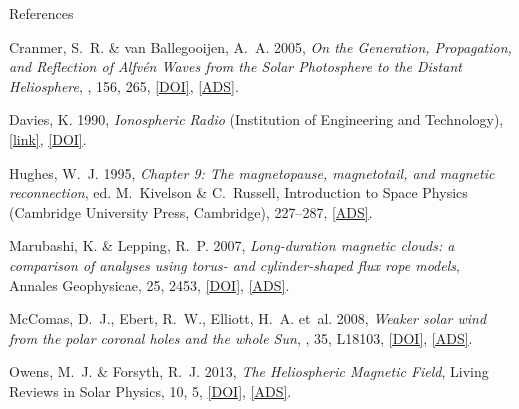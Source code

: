\documentclass[11pt,aspectratio=1610]{beamer}	%
\begin{document}
\begin{frame}[allowframebreaks]{References}
	\scriptsize
	\begin{thebibliography}{10}
	
		\beamertemplatebookbibitems
		
		\beamertemplatearticlebibitems
		
			{Cranmer}, S.~R. \& {van Ballegooijen}, A.~A. 2005, \emph{{On the Generation,
			Propagation, and Reflection of Alfv{\'e}n Waves from the Solar Photosphere to
			the Distant Heliosphere}}, \apjs, 156, 265,
			\href{http://dx.doi.org/10.1086/426507}{[DOI]},
			\href{http://adsabs.harvard.edu/abs/2005ApJS..156..265C}{[ADS]}.
		
			Davies, K. 1990, \emph{Ionospheric Radio} (Institution of Engineering and
			Technology),
			\href{http://digital-library.theiet.org/content/books/ew/pbew031e}{[link]},
			\href{http://dx.doi.org/10.1049/PBEW031E}{[DOI]}.
		
			{Hughes}, W.~J. 1995, \emph{{Chapter 9: The magnetopause, magnetotail, and
			magnetic reconnection}}, ed. M.~Kivelson \& C.~Russell, Introduction to Space
			Physics (Cambridge University Press, Cambridge), 227--287,
			\href{http://adsabs.harvard.edu/abs/1995isp..book.....K}{[ADS]}.
		
			{Marubashi}, K. \& {Lepping}, R.~P. 2007, \emph{{Long-duration magnetic clouds:
			a comparison of analyses using torus- and cylinder-shaped flux rope models}},
			Annales Geophysicae, 25, 2453,
			\href{http://dx.doi.org/10.5194/angeo-25-2453-2007}{[DOI]},
			\href{http://adsabs.harvard.edu/abs/2007AnGeo..25.2453M}{[ADS]}.
			
			{McComas}, D.~J., {Ebert}, R.~W., {Elliott}, H.~A. {et~al.} 2008{},
			\emph{{Weaker solar wind from the polar coronal holes and the whole Sun}},
			\grl, 35, L18103, \href{http://dx.doi.org/10.1029/2008GL034896}{[DOI]},
			\href{http://adsabs.harvard.edu/abs/2008GeoRL..3518103M}{[ADS]}.
		
			{Owens}, M.~J. \& {Forsyth}, R.~J. 2013, \emph{{The Heliospheric Magnetic
			Field}}, Living Reviews in Solar Physics, 10, 5,
			\href{http://dx.doi.org/10.12942/lrsp-2013-5}{[DOI]},
			\href{http://adsabs.harvard.edu/abs/2013LRSP...10....5O}{[ADS]}.
		

\end{thebibliography}
\end{frame}
\end{document}
